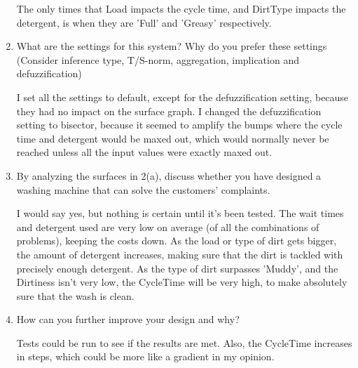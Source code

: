 \documentclass[11pt]{article}
\begin{document}
\begin{enumerate}[label=(\alph*)]
  The only times that Load impacts the cycle time, and DirtType impacts the
  detergent, is when they are 'Full' and 'Greasy' respectively.

  \item What are the settings for this system? Why do you prefer these settings
  (Consider inference type, T/S-norm, aggregation, implication and
  defuzziﬁcation)

  I set all the settings to default, except for the defuzzification setting,
  because they had no impact on the surface graph. I changed the
  defuzzification setting to bisector, because it seemed to amplify the bumps
  where the cycle time and detergent would be maxed out, which would normally
  never be reached unless all the input values were exactly maxed out.

  \item By analyzing the surfaces in 2(a), discuss whether you have designed a
  washing machine that can solve the customers’ complaints.

  I would say yes, but nothing is certain until it's been tested. The wait
  times and detergent used are very low on average (of all the combinations of
  problems), keeping the costs down. As the load or type of dirt gets bigger,
  the amount of detergent increases, making sure that the dirt is tackled with
  precisely enough detergent. As the type of dirt surpasses 'Muddy', and the
  Dirtiness isn't very low, the CycleTime will be very high, to make absolutely
  sure that the wash is clean.

  \item How can you further improve your design and why?

  Tests could be run to see if the results are met. Also, the CycleTime increases in steps, which could be more like a gradient in my opinion.

\end{enumerate}


\end{document}
